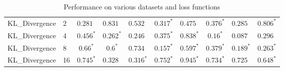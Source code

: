 \begin{table*}[tb]
\begin{tabular}{ll|cccccccc}
\midrule
KL_Divergence & 2 & $0.281\phantom{^*}$ & $0.831\phantom{^*}$ & $0.532\phantom{^*}$ & $0.317^*$ & $0.475\phantom{^*}$ & $0.376^*$ & $0.285\phantom{^*}$ & $0.806^*$ \\
KL_Divergence & 4 & $0.456^*$ & $0.262^*$ & $0.246\phantom{^*}$ & $0.375^*$ & $0.838^*$ & $0.16^*$ & $0.087\phantom{^*}$ & $0.296\phantom{^*}$ \\
KL_Divergence & 8 & $0.66^*$ & $0.6^*$ & $0.734\phantom{^*}$ & $0.157^*$ & $0.597^*$ & $0.379^*$ & $0.189^*$ & $0.263^*$ \\
KL_Divergence & 16 & $0.745^*$ & $0.328\phantom{^*}$ & $0.316^*$ & $0.752^*$ & $0.945^*$ & $0.734^*$ & $0.725\phantom{^*}$ & $0.648^*$ \\
\midrule
\bottomrule
\end{tabular}
\caption{Performance on various datasets and loss functions}
\end{table*}